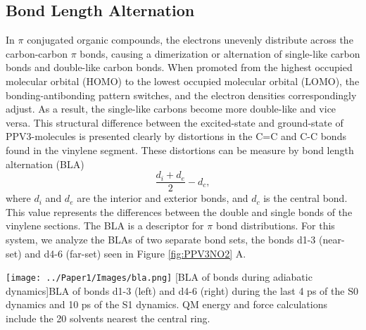 \subsection{Bond Length Alternation}
    In \(\pi\) conjugated organic compounds, the electrons unevenly distribute across the carbon-carbon \(\pi\) bonds, causing a dimerization or alternation of single-like carbon bonds and double-like carbon bonds.
    When promoted from the highest occupied molecular orbital (HOMO) to the lowest occupied molecular orbital (LOMO), the bonding-antibonding pattern switches, and the electron densities correspondingly adjust.
    As a result, the single-like carbons become more double-like and vice versa. \cite{bredas1999excited}
    This structural difference between the excited-state and ground-state of PPV3-molecules is presented clearly by distortions in the C=C and C-C bonds found in the vinylene segment.\cite{tretiak02_densit_matrix_analy_simul_elect, karabunarliev2000rigorous, karabunarliev2000adiabatic, nelson2014nonadiabatic}
    These distortions can be measure by bond length alternation (BLA)
    \begin{equation}
      \frac{d_i + d_e}{2} - d_c,
    \end{equation}
    where \(d_i\) and \(d_e\) are the interior and exterior bonds, and \(d_c\) is the central bond.
    This value represents the differences between the double and single bonds of the vinylene sections.
    The BLA is a descriptor for \(\pi\) bond distributions. \cite{tretiak2002conformational}
    For this system, we analyze the BLAs of two separate bond sets, the bonds d1-3 (near-set) and d4-6 (far-set) seen in Figure \ref{fig:PPV3NO2} A. 

    \noindent
    \begin{minipage}[c]{\textwidth} 
      \centering
      \texttt{[image: ../Paper1/Images/bla.png]}
      [BLA of bonds during adiabatic dynamics]{BLA of bonds d1-3 (left) and d4-6 (right) during the last 4 ps of the S0 dynamics and 10 ps of the S1 dynamics.
        QM energy and force calculations include the 20 solvents nearest the central ring.}
      \label{fig:bla_adiabatic}
    \end{minipage}\bigskip



